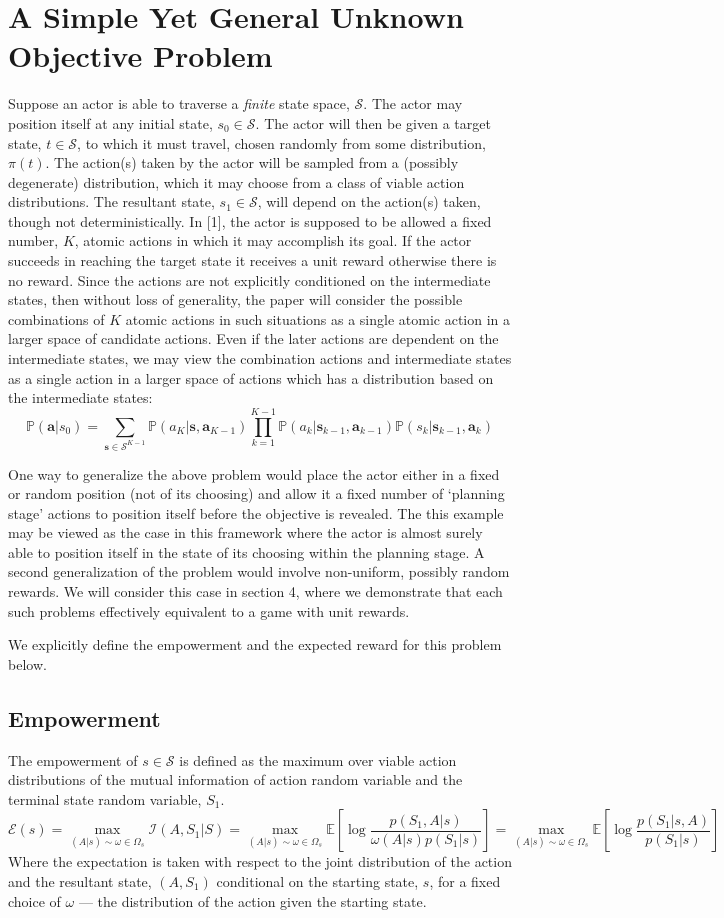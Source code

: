 \documentclass{article}
\newcommand{\EE}{\mathbb{E}}
\newcommand{\PP}{\mathbb{P}}
\newcommand{\Ss}{\mathcal{S}}
\newcommand{\Ii}{\mathcal{I}}
\newcommand{\Ee}{\mathcal{E}}
\begin{document}
\section{A Simple Yet General Unknown Objective Problem}
Suppose an actor is able to traverse a \textit{finite} state space, $\Ss$. 
The actor may position itself at any initial state, $s_0\in \Ss$. 
The actor will then be given a target state, $t\in \Ss$, to which it must travel, chosen randomly from some distribution, $\pi(t)$. 
The action(s) taken by the actor will be sampled from a (possibly degenerate) distribution, which it may choose from a class of viable action distributions. 
The resultant state, $s_1\in\Ss$, will depend on the action(s) taken, though not deterministically.  
In [1], the actor is supposed to be allowed a fixed number, $K$, atomic actions in which it may accomplish its goal. If the actor succeeds in reaching the target state it receives a unit reward otherwise there is no reward. Since the actions are not explicitly conditioned on the intermediate states, then without loss of generality, the paper will consider the possible combinations of $K$ atomic actions in such situations as a single atomic action in a larger space of candidate actions. Even if the later actions are dependent on the intermediate states, we may view the combination actions and intermediate states as a single action in a larger space of actions which has a distribution based on the intermediate states:
\[\PP(\mathbf{a}|s_0) = \sum_{\mathbf{s}\in \Ss^{K-1}} \PP(a_K|\mathbf{s},\mathbf{a}_{K-1}) \prod_{k=1}^{K-1} \PP(a_k|\mathbf{s}_{k-1},\mathbf{a}_{k-1})\PP(s_{k}|\mathbf{s}_{k-1},\mathbf{a}_k)\]

One way to generalize the above problem would place the actor either in a fixed or random position (not of its choosing) and allow it a fixed number of `planning stage' actions to position itself before the objective is revealed. 
The this example may be viewed as the case in this framework where the actor is almost surely able to position itself in the state of its choosing within the planning stage. A second generalization of the problem would involve non-uniform, possibly random rewards. We will consider this case in section 4, where we demonstrate that each such problems effectively equivalent to a game with unit rewards. 

We explicitly define the empowerment and the expected reward for this problem below.

\subsection{Empowerment}
The empowerment of $s\in\mathcal{S}$ is defined as the maximum over viable action distributions of the mutual information of action random variable and the terminal state random variable, $S_1$.
\[\Ee(s)=\max_{(A|s)\sim\omega\in\Omega_s}\Ii(A,S_1|S)=\max_{(A|s)\sim\omega\in\Omega_s}\EE\left[\log\frac{p(S_1,A|s)}{\omega(A|s)p(S_1|s)}\right]=\max_{(A|s)\sim\omega\in\Omega_s}\EE\left[\log\frac{p(S_1|s,A)}{p(S_1|s)}\right] \]
Where the expectation is taken with respect to the joint distribution of the action and the resultant state, $(A,S_1)$ conditional on the starting state, $s$, for a fixed choice of $\omega$ --- the distribution of the action given the starting state. 
\end{document}
